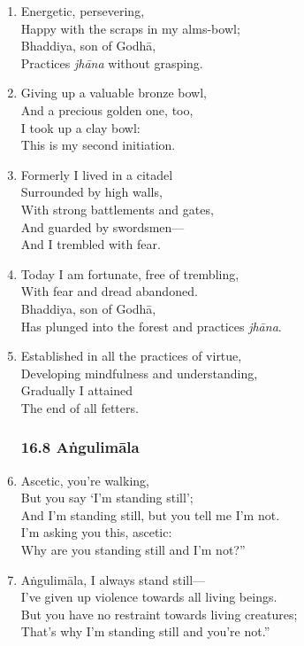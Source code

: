 \documentclass[10pt, openany]{book}
\newcommand*{\vleftofline}[1]{\leavevmode\llap{#1}}
\begin{document}
\begin{enumerate}
\item Energetic, persevering,\\
Happy with the scraps in my alms-bowl;\\
Bhaddiya, son of Godhā,\\
Practices \emph{jhāna} without grasping.

\item Giving up a valuable bronze bowl,\\
And a precious golden one, too,\\
I took up a clay bowl:\\
This is my second initiation.

\item Formerly I lived in a citadel \\
Surrounded by high walls,\\
With strong battlements and gates,\\
And guarded by swordsmen—\\
And I trembled with fear.

\item Today I am fortunate, free of trembling,\\
With fear and dread abandoned.\\
Bhaddiya, son of Godhā,\\
Has plunged into the forest and practices \emph{jhāna}.

\item Established in all the practices of virtue,\\
Developing mindfulness and understanding,\\
Gradually I attained\\
The end of all fetters.

\subsubsection*{16.8 Aṅgulimāla}

\item \vleftofline{“}Ascetic, you’re walking, \\
But you say ‘I’m standing still’;\\
And I’m standing still, but you tell me I’m not.\\
I’m asking you this, ascetic:\\
Why are you standing still and I’m not?”

\item \vleftofline{“}Aṅgulimāla, I always stand still—\\
I’ve given up violence towards all living beings.\\
But you have no restraint towards living creatures;\\
That’s why I’m standing still and you’re not.”


\end{enumerate}
\end{document}
